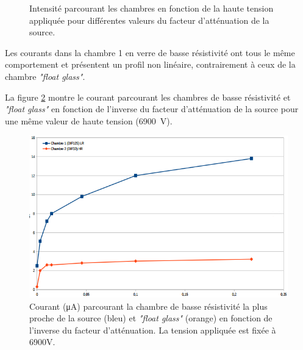 \begin{figure}[ht!]
	\centering
	\hfill
	\caption{Intensité parcourant les chambres en fonction de la haute tension appliquée pour différentes valeurs du facteur d'atténuation de la source.}
	\label{courant}
\end{figure}

Les courants dans la chambre 1 en verre de basse résistivité ont tous le même comportement et présentent un profil non linéaire, contrairement à ceux de la chambre \textit{"float glass"}.

La figure \ref{currentsamHV} montre le courant parcourant les chambres de basse résistivité et \textit{"float glass"} en fonction de l'inverse du facteur d'atténuation de la source pour une même valeur de haute tension (\SI{6900}{\volt}).

\begin{figure}[ht!]
	\centering
	\includegraphics[width=.75\linewidth]{GLA/current_same_HV.png}
	\caption{Courant (\si{\micro\ampere}) parcourant la chambre de basse résistivité la plus proche de la source (bleu) et \textit{"float glass"} (orange) en fonction de l'inverse du facteur d'atténuation. La tension appliquée est fixée à 6900V.}
	\label{currentsamHV}
\end{figure}

